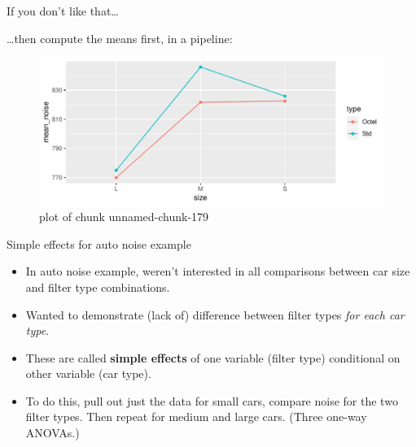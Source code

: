 \documentclass[ignorenonframetext,]{beamer}
\newenvironment{Shaded}{\begin{snugshade}}{\end{snugshade}}
\newcommand{\DataTypeTok}[1]{\textcolor[rgb]{0.13,0.29,0.53}{#1}}
\newcommand{\KeywordTok}[1]{\textcolor[rgb]{0.13,0.29,0.53}{\textbf{#1}}}
\newcommand{\NormalTok}[1]{#1}
\newcommand{\OperatorTok}[1]{\textcolor[rgb]{0.81,0.36,0.00}{\textbf{#1}}}
\newcommand{\StringTok}[1]{\textcolor[rgb]{0.31,0.60,0.02}{#1}}
\begin{document}
\begin{frame}[fragile]{If you don't like that\ldots}
\protect\hypertarget{if-you-dont-like-that}{}

\ldots then compute the means first, in a pipeline:

\begin{Shaded}
\end{Shaded}

\begin{figure}
\centering
\includegraphics{figure/unnamed-chunk-179-1.pdf}
\caption{plot of chunk unnamed-chunk-179}
\end{figure}

\end{frame}

\begin{frame}{Simple effects for auto noise example}
\protect\hypertarget{simple-effects-for-auto-noise-example}{}

\begin{itemize}
\item
  In auto noise example, weren't interested in all comparisons between
  car size and filter type combinations.
\item
  Wanted to demonstrate (lack of) difference between filter types
  \emph{for each car type}.
\item
  These are called \textbf{simple effects} of one variable (filter type)
  conditional on other variable (car type).
\item
  To do this, pull out just the data for small cars, compare noise for
  the two filter types. Then repeat for medium and large cars. (Three
  one-way ANOVAs.)
\end{itemize}

\end{frame}
\end{document}
